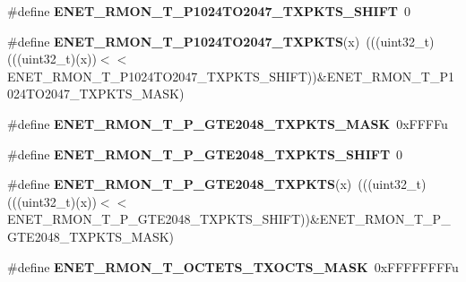 \begin{DoxyCompactItemize}
\item 
\#define {\bfseries E\+N\+E\+T\+\_\+\+R\+M\+O\+N\+\_\+\+T\+\_\+\+P1024\+T\+O2047\+\_\+\+T\+X\+P\+K\+T\+S\+\_\+\+S\+H\+I\+FT}~0\hypertarget{group__ENET__Register__Masks_gaec4f9a8714bcb59e866d0e64b70f0fde}{}\label{group__ENET__Register__Masks_gaec4f9a8714bcb59e866d0e64b70f0fde}

\item 
\#define {\bfseries E\+N\+E\+T\+\_\+\+R\+M\+O\+N\+\_\+\+T\+\_\+\+P1024\+T\+O2047\+\_\+\+T\+X\+P\+K\+TS}(x)~(((uint32\+\_\+t)(((uint32\+\_\+t)(x))$<$$<$E\+N\+E\+T\+\_\+\+R\+M\+O\+N\+\_\+\+T\+\_\+\+P1024\+T\+O2047\+\_\+\+T\+X\+P\+K\+T\+S\+\_\+\+S\+H\+I\+FT))\&E\+N\+E\+T\+\_\+\+R\+M\+O\+N\+\_\+\+T\+\_\+\+P1024\+T\+O2047\+\_\+\+T\+X\+P\+K\+T\+S\+\_\+\+M\+A\+SK)\hypertarget{group__ENET__Register__Masks_ga7d34dedcf25d5b7973dc87c620f61e75}{}\label{group__ENET__Register__Masks_ga7d34dedcf25d5b7973dc87c620f61e75}

\item 
\#define {\bfseries E\+N\+E\+T\+\_\+\+R\+M\+O\+N\+\_\+\+T\+\_\+\+P\+\_\+\+G\+T\+E2048\+\_\+\+T\+X\+P\+K\+T\+S\+\_\+\+M\+A\+SK}~0x\+F\+F\+F\+Fu\hypertarget{group__ENET__Register__Masks_ga6727e73f1f19091ffc8c3677c27cf51c}{}\label{group__ENET__Register__Masks_ga6727e73f1f19091ffc8c3677c27cf51c}

\item 
\#define {\bfseries E\+N\+E\+T\+\_\+\+R\+M\+O\+N\+\_\+\+T\+\_\+\+P\+\_\+\+G\+T\+E2048\+\_\+\+T\+X\+P\+K\+T\+S\+\_\+\+S\+H\+I\+FT}~0\hypertarget{group__ENET__Register__Masks_ga8ebafd824d8947f833675eeed78a3fb1}{}\label{group__ENET__Register__Masks_ga8ebafd824d8947f833675eeed78a3fb1}

\item 
\#define {\bfseries E\+N\+E\+T\+\_\+\+R\+M\+O\+N\+\_\+\+T\+\_\+\+P\+\_\+\+G\+T\+E2048\+\_\+\+T\+X\+P\+K\+TS}(x)~(((uint32\+\_\+t)(((uint32\+\_\+t)(x))$<$$<$E\+N\+E\+T\+\_\+\+R\+M\+O\+N\+\_\+\+T\+\_\+\+P\+\_\+\+G\+T\+E2048\+\_\+\+T\+X\+P\+K\+T\+S\+\_\+\+S\+H\+I\+FT))\&E\+N\+E\+T\+\_\+\+R\+M\+O\+N\+\_\+\+T\+\_\+\+P\+\_\+\+G\+T\+E2048\+\_\+\+T\+X\+P\+K\+T\+S\+\_\+\+M\+A\+SK)\hypertarget{group__ENET__Register__Masks_gaa17d4f1013a6f284d558190f7aab76ac}{}\label{group__ENET__Register__Masks_gaa17d4f1013a6f284d558190f7aab76ac}

\item 
\#define {\bfseries E\+N\+E\+T\+\_\+\+R\+M\+O\+N\+\_\+\+T\+\_\+\+O\+C\+T\+E\+T\+S\+\_\+\+T\+X\+O\+C\+T\+S\+\_\+\+M\+A\+SK}~0x\+F\+F\+F\+F\+F\+F\+F\+Fu\hypertarget{group__ENET__Register__Masks_ga5ad525f27fd78ec68eefefbff4b87b3a}{}\label{group__ENET__Register__Masks_ga5ad525f27fd78ec68eefefbff4b87b3a}


\end{DoxyCompactItemize}
